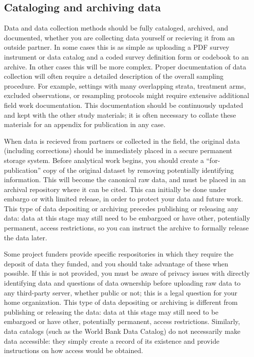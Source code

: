 \subsection{Cataloging and archiving data}

Data and data collection methods should be fully cataloged, archived, and documented,
whether you are collecting data yourself or recieving it from an outside partner.
In some cases this is as simple as uploading a PDF survey instrument or data catalog
and a coded survey definition form or codebook to an archive.
In other cases this will be more complex.
Proper documentation of data collection will often require
a detailed description of the overall sampling procedure.
For example, settings with many overlapping strata,
treatment arms, excluded observations, or resampling protocols
might require extensive additional field work documentation.
This documentation should be continuously updated
and kept with the other study materials;
it is often necessary to collate these materials
for an appendix for publication in any case.

When data is recieved from partners or collected in the field,
the original data (including corrections)
should be immediately placed in a secure permanent storage system.
Before analytical work begins, you should create a ``for-publication''
copy of the original dataset by removing potentially identifying information.
This will become the canonical raw data, and must be
placed in an archival repository where it can be cited.\cite{vilhuber2020report}
This can initially be done under embargo or with limited release,
in order to protect your data and future work.
This type of data depositing or archiving
precedes publishing or releasing any data:
data at this stage may still need to be embargoed
or have other, potentially permanent, access restrictions,
so you can instruct the archive to formally release the data later.

Some project funders
provide specific respositories in which they require the deposit of data they funded,
and you should take advantage of these when possible.
If this is not provided, you must be aware of privacy issues
with directly identifying data and questions of data ownership
before uploading raw data to any third-party server, whether public or not;
this is a legal question for your home organization.
This type of data depositing or archiving
is different from publishing or releasing the data:
data at this stage may still need to be embargoed
or have other, potentially permanent, access restrictions.
Similarly, data catalogs (such as the World Bank Data Catalog)
do not necessarily make data accessible: they simply create a record of its existence
and provide instructions on how access would be obtained.

